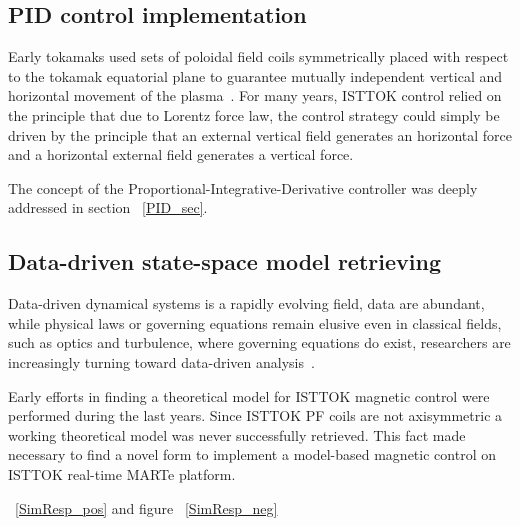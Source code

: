 \subsection{PID control implementation}

Early tokamaks used sets of poloidal field coils symmetrically placed with respect to the tokamak equatorial plane to guarantee mutually independent vertical and horizontal movement of the plasma~\cite[Chapter~1]{PirontiBook}.   For many years, ISTTOK control relied on the principle that due to Lorentz force law, the control strategy could simply be driven by the principle that an external vertical field  generates an horizontal force and a horizontal external field generates a vertical force. \smallskip  

The concept of the Proportional-Integrative-Derivative controller was deeply addressed in section ~\ref{PID_sec}.\smallskip

\subsection{Data-driven state-space model retrieving }
Data-driven dynamical systems is a rapidly evolving field, data are abundant, while physical laws or governing equations remain elusive even in classical fields, such as optics and turbulence, where governing equations do exist, researchers are increasingly turning toward data-driven analysis~\cite[Chapter~7]{DataDriven2019}.\smallskip

Early efforts in finding a theoretical model for ISTTOK magnetic control were performed during  the last years. Since ISTTOK PF coils are not axisymmetric a working theoretical model  was never successfully retrieved. This fact made necessary to find a novel form to implement a model-based magnetic control on ISTTOK real-time MARTe platform.    

~\ref{SimResp_pos} and figure ~\ref{SimResp_neg}



